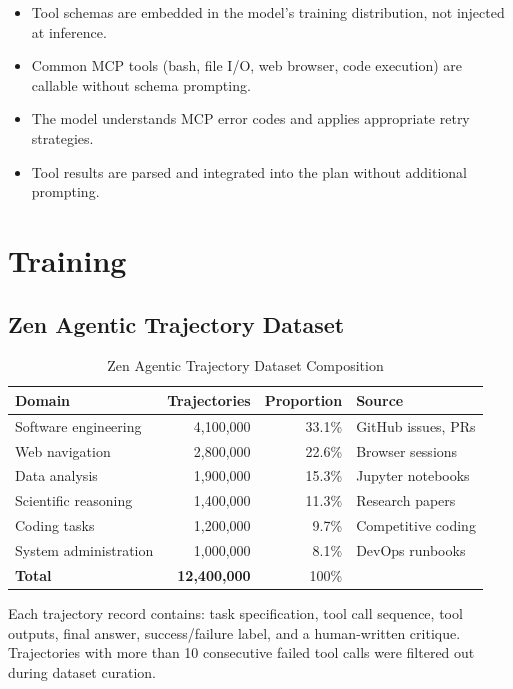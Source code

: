 \documentclass[11pt,a4paper]{article}
\begin{document}
\begin{itemize}
    \item Tool schemas are embedded in the model's training distribution, not injected at inference.
    \item Common MCP tools (bash, file I/O, web browser, code execution) are callable without
    schema prompting.
    \item The model understands MCP error codes and applies appropriate retry strategies.
    \item Tool results are parsed and integrated into the plan without additional prompting.
\end{itemize}

\section{Training}

\subsection{Zen Agentic Trajectory Dataset}

\begin{table}[H]
\centering
\begin{tabular}{lrrl}
\toprule
\textbf{Domain} & \textbf{Trajectories} & \textbf{Proportion} & \textbf{Source} \\
\midrule
Software engineering & 4,100,000 & 33.1\% & GitHub issues, PRs \\
Web navigation & 2,800,000 & 22.6\% & Browser sessions \\
Data analysis & 1,900,000 & 15.3\% & Jupyter notebooks \\
Scientific reasoning & 1,400,000 & 11.3\% & Research papers \\
Coding tasks & 1,200,000 & 9.7\% & Competitive coding \\
System administration & 1,000,000 & 8.1\% & DevOps runbooks \\
\midrule
\textbf{Total} & \textbf{12,400,000} & 100\% & \\
\bottomrule
\end{tabular}
\caption{Zen Agentic Trajectory Dataset Composition}
\end{table}

Each trajectory record contains: task specification, tool call sequence, tool outputs, final
answer, success/failure label, and a human-written critique. Trajectories with more than 10
consecutive failed tool calls were filtered out during dataset curation.
\end{document}
